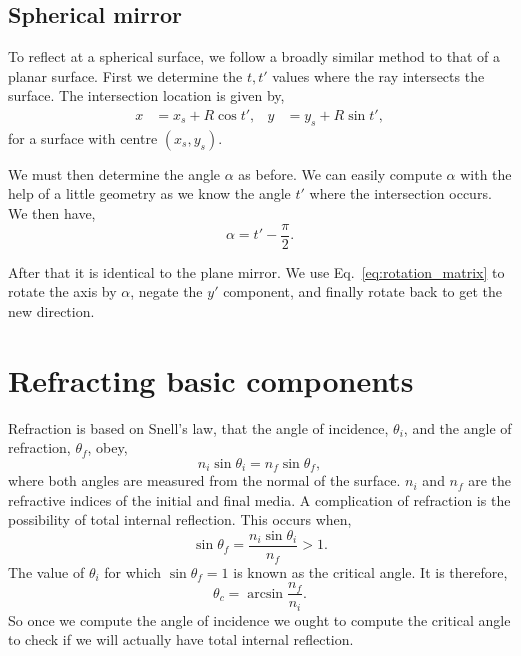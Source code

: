 \documentclass{article}
\begin{document}
\subsection{Spherical mirror}
To reflect at a spherical surface, we follow a broadly similar method to that of a planar surface. First we determine the $t, t'$ values where the ray intersects the surface. The intersection location is given by,
\begin{align}
    x
    &=
    x_s + R \cos t',
    &
    y
    &=
    y_s + R \sin t',
\end{align}
for a surface with centre $(x_s, y_s)$.

We must then determine the angle $\alpha$ as before. We can easily compute $\alpha$ with the help of a little geometry as we know the angle $t'$ where the intersection occurs. We then have,
\begin{equation}
    \label{eq:alpha_sph}
    \alpha = t' - \frac{\pi}{2}.
\end{equation}

After that it is identical to the plane mirror. We use Eq.~\ref{eq:rotation_matrix} to rotate the axis by $\alpha$, negate the $y'$ component, and finally rotate back to get the new direction.

\section{Refracting basic components}
Refraction is based on Snell's law, that the angle of incidence, $\theta_i$, and the angle of refraction, $\theta_f$, obey,
\begin{equation}
    n_i \sin \theta_i 
    =
    n_f \sin \theta_f,
\end{equation}
where both angles are measured from the normal of the surface. $n_i$ and $n_f$ are the refractive indices of the initial and final media. A complication of refraction is the possibility of total internal reflection. This occurs when,
\begin{equation}
    \sin \theta_f 
    =
    \frac{n_i \sin \theta_i}{n_f} > 1.
\end{equation}
The value of $\theta_i$ for which $\sin{\theta_f} = 1$ is known as the critical angle. It is therefore,
\begin{equation}
    \theta_c
    =
    \arcsin{\frac{n_f}{n_i}}.
\end{equation}
So once we compute the angle of incidence we ought to compute the critical angle to check if we will actually have total internal reflection.
\end{document}
